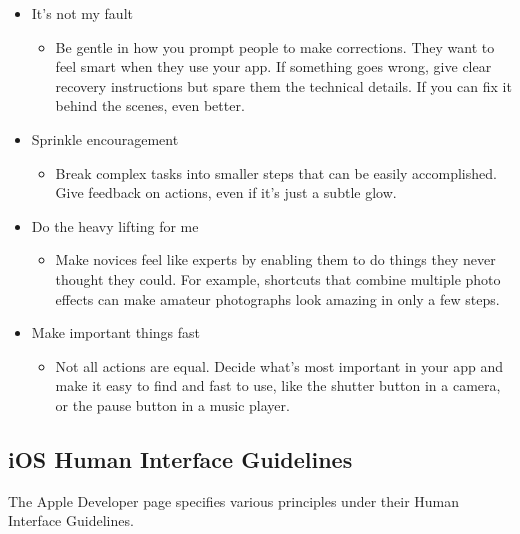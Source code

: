 \begin{itemize}
\begin{itemize}
\begin{itemize}
\end{itemize}
\item It's not my fault
\begin{itemize}
\item Be gentle in how you prompt people to make corrections. They want to feel smart when they use your app. If something goes wrong, give clear recovery instructions but spare them the technical details. If you can fix it behind the scenes, even better.
\end{itemize}
\item Sprinkle encouragement
\begin{itemize}
\item Break complex tasks into smaller steps that can be easily accomplished. Give feedback on actions, even if it's just a subtle glow.
\end{itemize}
\item Do the heavy lifting for me
\begin{itemize}
\item Make novices feel like experts by enabling them to do things they never thought they could. For example, shortcuts that combine multiple photo effects can make amateur photographs look amazing in only a few steps.
\end{itemize}
\item Make important things fast
\begin{itemize}
\item Not all actions are equal. Decide what's most important in your app and make it easy to find and fast to use, like the shutter button in a camera, or the pause button in a music player.
\end{itemize}
\end{itemize}
\end{itemize}

\subsection*{iOS Human Interface Guidelines}
The Apple Developer page specifies various principles under their Human Interface Guidelines.


